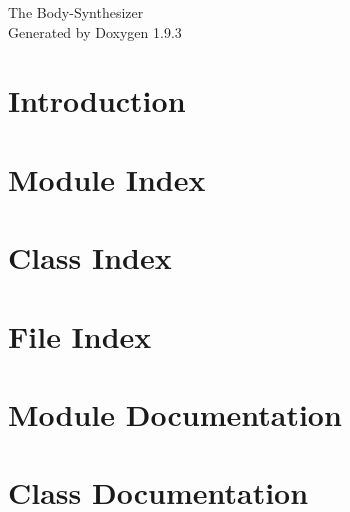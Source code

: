 \documentclass[twoside]{book}
\newcommand{\+}{\discretionary{\mbox{\scriptsize$\hookleftarrow$}}{}{}}
\newcommand{\clearemptydoublepage}{%
    \newpage{\pagestyle{empty}\cleardoublepage}%
  }
\begin{document}
  \raggedbottom
    \hypersetup{pageanchor=false,
                bookmarksnumbered=true,
                pdfencoding=unicode
               }
  \begin{titlepage}
  \vspace*{7cm}
  \begin{center}%
  {\Large The Body-\/\+Synthesizer}\\
  \vspace*{1cm}
  {\large Generated by Doxygen 1.9.3}\\
  \end{center}
  \end{titlepage}
  \clearemptydoublepage
  \tableofcontents
  \clearemptydoublepage
  \hypersetup{pageanchor=true}
\chapter{Introduction}
\label{index}\hypertarget{index}{}
\chapter{Module Index}

\chapter{Class Index}

\chapter{File Index}

\chapter{Module Documentation}

















\chapter{Class Documentation}









\end{document}
